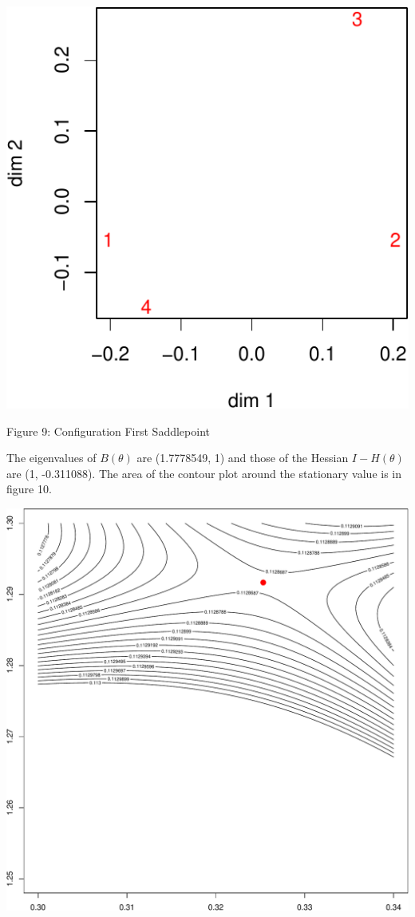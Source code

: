 \documentclass[
  12pt,
]{article}
\begin{document}
\begin{center}\includegraphics{twoPoints_files/figure-latex/configuration_first_saddlepoint-1} \end{center}

Figure 9: Configuration First Saddlepoint

The eigenvalues of \(B(\theta)\) are (1.7778549, 1) and those of the Hessian \(I-H(\theta)\) are
(1, -0.311088). The area of the contour plot around the stationary value is in figure 10.

\begin{center}\includegraphics{twoPoints_files/figure-latex/contour_first_saddlepoint-1} \end{center}
\end{document}
